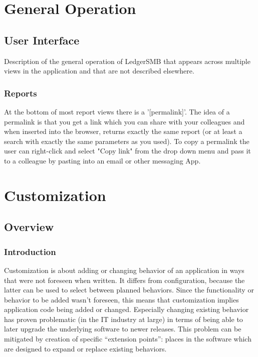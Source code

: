 
\part{General Operation}
\label{part-general-operation}

\chapter{User Interface}
\label{cha-general-operation-user-interfacei}
Description of the general operation of LedgerSMB that appears across multiple views in the application and that are not described elsewhere.

\section{Reports}
\label{sec-general-operation-user-interface-reports}

At the bottom of most report views there is a '[permalink]'. The idea of a \gls{permalink} is that you get a link which you can share with your colleagues and when inserted into the browser, returns exactly the same report (or at least a search with exactly the same parameters as you used).  To copy a  \gls{permalink} the user can right-click and select "Copy link" from the drop down menu and pass it to a colleague by pasting into an email or other messaging App.

\part{Customization}
\label{part-customization}

\chapter{Overview}
\label{cha-customization-overview}

\section{Introduction}
\label{sec-customization-overview-introduction}

Customization is about adding or changing behavior of an application in ways that were not foreseen when written.  It differs from configuration, because the latter can be used to select between planned behaviors.  Since the functionality or behavior to be added wasn't foreseen, this means that customization implies application code being added or changed.  Especially changing existing behavior has proven problematic (in the IT industry at large) in terms of being able to later upgrade the underlying software to newer releases.  This problem can be mitigated by creation of specific ``extension points'': places in the software which are designed to expand or replace existing behaviors.

